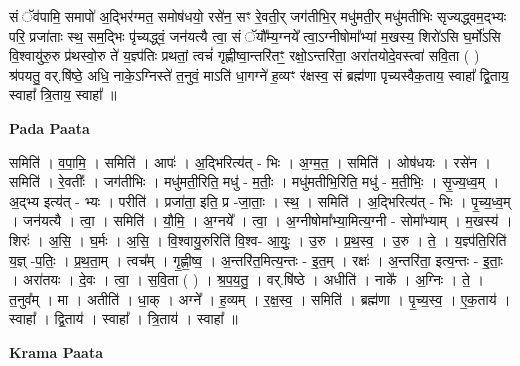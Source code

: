 \documentclass[17pt]{extarticle}
\begin{document}
सं ॅव॑पामि॒ समापो॑ अ॒द्भिर॑ग्मत॒ समोष॑धयो॒ रसे॑न॒ सꣳ रे॒वती॒र् जग॑तीभि॒र् मधु॑मती॒र् मधु॑मतीभिः सृज्यद्ध्वम॒द्भ्यः परि॒ प्रजा॑ताः स्थ॒ सम॒द्भिः पृ॑च्यद्ध्वं॒ जन॑यत्यै त्वा॒ सं ॅयौ᳚म्य॒ग्नये᳚ त्वा॒ऽग्नीषोमा᳚भ्यां म॒खस्य॒ शिरो॑ऽसि घ॒र्मो॑ऽसि वि॒श्वायु॑रु॒रु प्र॑थस्वो॒रु ते॑ य॒ज्ञ्प॑तिः प्रथतां॒ त्वचं॑ गृह्णीष्वा॒न्तरि॑तꣳ॒॒ रक्षो॒ऽन्तरि॑ता॒ अरा॑तयोदे॒वस्त्वा॑ सवि॒ता ( ) श्र॑पयतु॒ वर्.षि॑ष्ठे॒ अधि॒ नाके॒ऽग्निस्ते॑ त॒नुवं॒ माऽति॑ धा॒गग्ने॑ ह॒व्यꣳ र॑क्षस्व॒ सं ब्रह्म॑णा पृच्यस्वैक॒ताय॒ स्वाहा᳚ द्वि॒ताय॒ स्वाहा᳚ त्रि॒ताय॒ स्वाहा᳚ ॥ \newline

\textbf{Pada Paata} \newline

समिति॑ । व॒पा॒मि॒ । समिति॑ । आपः॑ । अ॒द्भिरित्य॑त् - भिः । अ॒ग्म॒त॒ । समिति॑ । ओष॑धयः । रसे॑न । समिति॑ । रे॒वतीः᳚ । जग॑तीभिः । मधु॑मती॒रिति॒ मधु॑ - म॒तीः॒ । मधु॑मतीभि॒रिति॒ मधु॑ - म॒ती॒भिः॒ । सृ॒ज्य॒ध्व॒म् । अ॒द्भ्य इत्य॑त् - भ्यः । परीति॑ । प्रजा॑ता॒ इति॒ प्र -जा॒ताः॒ । स्थ॒ । समिति॑ । अ॒द्भिरित्य॑त् - भिः । पृ॒च्य॒ध्व॒म् । जन॑यत्यै । त्वा॒ । समिति॑ । यौ॒मि॒ । अ॒ग्नये᳚ । त्वा॒ । अ॒ग्नीषोमा᳚भ्या॒मित्य॒ग्नी - सोमा᳚भ्याम् । म॒खस्य॑ । शिरः॑ । अ॒सि॒ । घ॒र्मः । अ॒सि॒ । वि॒श्वायु॒रुरिति॑ वि॒श्व- आ॒युः॒ । उ॒रु । प्र॒थ॒स्व॒ । उ॒रु । ते॒ । य॒ज्ञ्प॑ति॒रिति॑ य॒ज्ञ् -प॒तिः॒ । प्र॒थ॒ता॒म् । त्वच᳚म् । गृ॒ह्णी॒ष्व॒ । अ॒न्तरि॑त॒मित्य॒न्तः - इ॒त॒म् । रक्षः॑ । अ॒न्तरि॑ता॒ इत्य॒न्तः - इ॒ताः॒ । अरा॑तयः । दे॒वः । त्वा॒ । स॒वि॒ता ( ) । श्र॒प॒य॒तु॒ । वर्.षि॑ष्ठे । अधीति॑ । नाके᳚ । अ॒ग्निः । ते॒ । त॒नुव᳚म् । मा । अतीति॑ । धा॒क् । अग्ने᳚ । ह॒व्यम् । र॒क्ष॒स्व॒ । समिति॑ । ब्रह्म॑णा । पृ॒च्य॒स्व॒ । ए॒क॒ताय॑ । स्वाहा᳚ । द्वि॒ताय॑ । स्वाहा᳚ । त्रि॒ताय॑ । स्वाहा᳚ ॥  \newline


\textbf{Krama Paata} \newline
\end{document}

